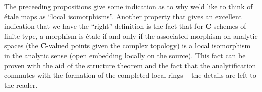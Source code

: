 \noindent
The preceeding propositions give some indication as to why we'd like to think
of \'etale maps as ``local isomorphisms''. Another property that gives an
excellent indication that we have the ``right'' definition is the fact that
for $\mathbf{C}$-schemes of finite type, a morphism is \'etale if and only if the
associated morphism on analytic spaces (the $\mathbf{C}$-valued points given the
complex topology) is a local isomorphism in the analytic sense (open
embedding locally on the source). This fact can be proven with the aid of the
structure theorem and the fact that the analytification commutes with the
formation of the completed local rings -- the details are left to the reader.









